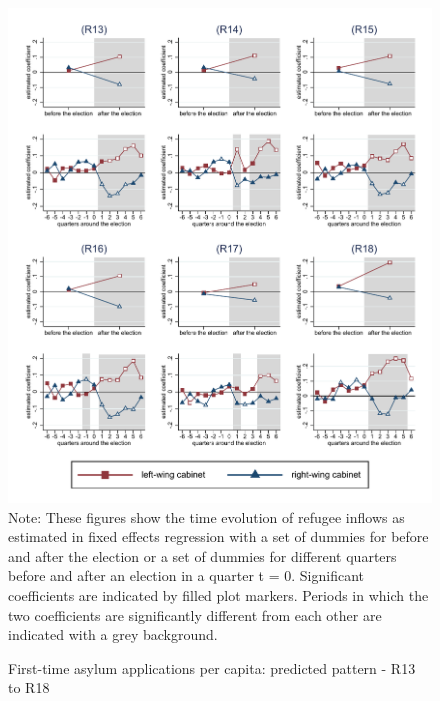 \documentclass[11pt,a4paper]{scrartcl}
\begin{document}
\clearpage
\FloatBarrier


\clearpage
\FloatBarrier
\begin{figure}[!ht]
	\caption{First-time asylum applications per capita: predicted pattern - R13 to R18}
	\includegraphics[width=1\textwidth]{../results/applications/app_graphs_R13-R18.pdf}
	\scriptsize{Note: These figures show the time evolution of refugee inflows as estimated in fixed effects regression
		with a set of dummies for before and after the election or a set of dummies for different quarters before and after an election in a quarter t = 0. Significant coefficients are indicated by filled plot markers. Periods in which the two coefficients are significantly different from each other are indicated with a grey background.}
\end{figure}

%
%
%
%
%
%
%
\end{document}
